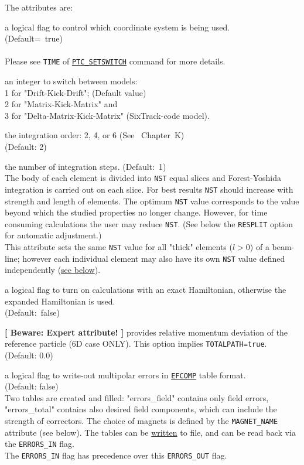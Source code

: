 The attributes are:
\begin{madlist}

   a logical flag to control which coordinate system 
  is being used. \\ (Default=~true) \\ \\
  Please see \texttt{TIME} of \hyperref[sec:ptc-setswitch]{\texttt{PTC\_SETSWITCH}}
  command for more details.
   
   an integer to switch between models:\\
  1 for "Drift-Kick-Drift";  (Default value)\\ 
  2 for "Matrix-Kick-Matrix" and \\ 
  3 for "Delta-Matrix-Kick-Matrix" (SixTrack-code model).

   the integration order: 2, 4, or 6 (See
  \cite{forest2002}~Chapter~K) \\ (Default: 2)

   the number of integration steps.  (Default:~1)\\
  The body of each element is divided into \texttt{NST} equal slices and
  Forest-Yoshida integration is carried out on each slice.
  For best results \texttt{NST} should increase with strength
  and length of elements. The optimum \texttt{NST} value corresponds to 
  the value beyond which the studied properties no longer change. 
  However, for time consuming calculations the user may
  reduce \texttt{NST}. (See below the \texttt{RESPLIT} option for automatic
  adjustment.)\\
  This attribute sets the same \texttt{NST} value  for all "thick" elements
  ($l > 0$) of a beam-line; however each individual element may also have
  its own \texttt{NST} value defined independently 
  (\hyperref[sec:add-option-PTC]{see below}).

   a logical flag to turn on calculations with an exact
  Hamiltonian, otherwise the expanded Hamiltonian is used. \\
  (Default:~false)

   \textbf{[ Beware: Expert attribute! ]}
  provides relative momentum deviation of the reference particle (6D case
  ONLY). This option implies \texttt{TOTALPATH=true}. \\
  (Default: 0.0)

   a logical flag to write-out multipolar errors
  in \hyperref[sec:efcomp]{\texttt{EFCOMP}} table format. 
  \\ (Default: false) \\
  Two tables are created and filled: "errors\_field" contains only
  field errors, "errors\_total" contains also desired field
  components, which can include the strength of correctors.  
  The choice of magnets is defined by the \texttt{MAGNET\_NAME}
  attribute (see below). 
  The tables can be \hyperref[sec:write]{written} to file, and can be
  read back via the \texttt{ERRORS\_IN} flag.\\ 
  The \texttt{ERRORS\_IN} flag has precedence over this \texttt{ERRORS\_OUT} flag.


\end{madlist}

